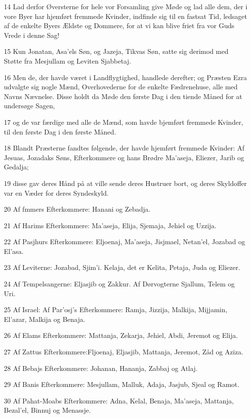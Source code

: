 \par 14 Lad derfor Øversterne for hele vor Forsamling give Møde og lad alle dem, der i vore Byer har hjemført fremmede Kvinder, indfinde sig til en fastsat Tid, ledsaget af de enkelte Byers Ældste og Dommere, for at vi kan blive friet fra vor Guds Vrede i denne Sag!
\par 15 Kun Jonatan, Asa'els Søn, og Jazeja, Tikvas Søn, satte sig derimod med Støtte fra Mesjullam og Leviten Sjabbetaj.
\par 16 Men de, der havde været i Landflygtighed, handlede derefter; og Præsten Ezra udvalgte sig nogle Mænd, Overhovederne for de enkelte Fædrenehuse, alle med Navns Nævnelse. Disse holdt da Møde den første Dag i den tiende Måned for at undersøge Sagen,
\par 17 og de var færdige med alle de Mænd, som havde bjemført fremmede Kvinder, til den første Dag i den første Måned.
\par 18 Blandt Præsterne fandtes følgende, der havde hjemført fremmede Kvinder: Af Jesuas, Jozadaks Søns, Efterkommere og hans Brødre Ma'aseja, Eliezer, Jarib og Gedalja;
\par 19 disse gav deres Hånd på at ville sende deres Hustruer bort, og deres Skyldoffer var en Væder for deres Syndeskyld.
\par 20 Af fmmers Efterkommere: Hanani og Zebadja.
\par 21 Af Harims Efterkommere: Ma'aseja, Elija, Sjemaja, Jehiel og Uzzija.
\par 22 Af Pasjhurs Efterkommere: Eljoenaj, Ma'aseja, Jisjmael, Netan'el, Jozabad og El'asa.
\par 23 Af Leviterne: Jozabad, Sjim'i. Kelaja, det er Kelita, Petaja, Juda og Eliezer.
\par 24 Af Tempelsangerne: Eljasjib og Zakkur. Af Dørvogterne Sjallum, Telem og Uri.
\par 25 Af Israel: Af Par'osj's Efterkommere: Ramja, Jizzija, Malkija, Mijjamin, El'azar, Malkija og Benaja.
\par 26 Af Elams Efterkommere: Mattanja, Zekarja, Jehiel, Abdi, Jeremot og Elija.
\par 27 Af Zattus Efterkommere:Fljoenaj, Eljasjib, Mattanja, Jeremot, Zåd og Aziza.
\par 28 Af Bebajs Efterkommere: Johanan, Hananja, Zabbaj og Atlaj.
\par 29 Af Banis Efterkommere: Mesjullam, Malluk, Adaja, Jasjub, Sjeal og Ramot.
\par 30 Af Pahat-Moabs Efterkommere: Adna, Kelal, Benaja, Ma'aseja, Mattanja, Bezal'el, Binnuj og Menassje.
